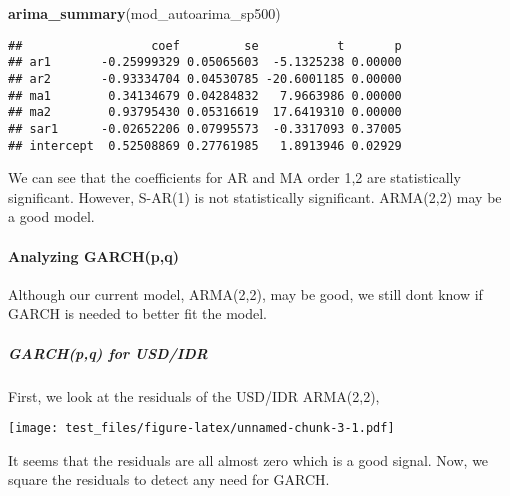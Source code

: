 \documentclass[]{article}
\newenvironment{Shaded}{\begin{snugshade}}{\end{snugshade}}
\newcommand{\KeywordTok}[1]{\textcolor[rgb]{0.13,0.29,0.53}{\textbf{#1}}}
\newcommand{\CommentTok}[1]{\textcolor[rgb]{0.56,0.35,0.01}{\textit{#1}}}
\newcommand{\OperatorTok}[1]{\textcolor[rgb]{0.81,0.36,0.00}{\textbf{#1}}}
\newcommand{\NormalTok}[1]{#1}
\let\oldparagraph\paragraph
\renewcommand{\paragraph}[1]{\oldparagraph{#1}\mbox{}}
\let\oldsubparagraph\subparagraph
\renewcommand{\subparagraph}[1]{\oldsubparagraph{#1}\mbox{}}
\begin{document}
\begin{Shaded}
\begin{Highlighting}[]
\KeywordTok{arima_summary}\NormalTok{(mod_autoarima_sp500)}
\end{Highlighting}
\end{Shaded}

\begin{verbatim}
##                  coef         se           t       p
## ar1       -0.25999329 0.05065603  -5.1325238 0.00000
## ar2       -0.93334704 0.04530785 -20.6001185 0.00000
## ma1        0.34134679 0.04284832   7.9663986 0.00000
## ma2        0.93795430 0.05316619  17.6419310 0.00000
## sar1      -0.02652206 0.07995573  -0.3317093 0.37005
## intercept  0.52508869 0.27761985   1.8913946 0.02929
\end{verbatim}

We can see that the coefficients for AR and MA order 1,2 are
statistically significant. However, S-AR(1) is not statistically
significant. ARMA(2,2) may be a good model.

\paragraph{Analyzing GARCH(p,q)}\label{analyzing-garchpq}

Although our current model, ARMA(2,2), may be good, we still dont know
if GARCH is needed to better fit the model.

\subparagraph{GARCH(p,q) for USD/IDR}\label{garchpq-for-usdidr}

First, we look at the residuals of the USD/IDR ARMA(2,2),

\begin{Shaded}
\end{Shaded}

\texttt{[image: test\_files/figure-latex/unnamed-chunk-3-1.pdf]}

It seems that the residuals are all almost zero which is a good signal.
Now, we square the residuals to detect any need for GARCH.

\begin{Shaded}
\end{Shaded}
\end{document}
